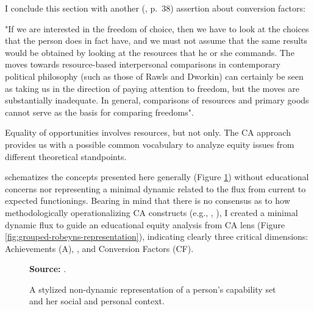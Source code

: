 I conclude this section with another  (\citeyear{sen:1992}, p.~38) assertion about conversion factors: 
\begin{citacao}
    "If we are interested in the freedom of choice, then we have to look at the choices that the person does in fact have, and we must not assume that the same results would be obtained by looking at the resources that he or she commands. The moves towards resource-based interpersonal comparisons in contemporary political philosophy (such as those of Rawls and Dworkin) can certainly be seen as taking us in the direction of paying attention to freedom, but the moves are substantially inadequate. In general, comparisons of resources and primary goods cannot serve as the basis for comparing freedoms".
\end{citacao}
Equality of opportunities involves resources, but not only. The \gls{CA} approach provides us with a possible common vocabulary to analyze equity issues from different theoretical standpoints. 

 schematizes the concepts presented here generally (Figure \ref{fig:robeyns-representation}) without educational concerns nor representing a minimal dynamic related to the flux from current to expected functionings. Bearing in mind that there is no consensus as to how methodologically operationalizing \gls{CA} constructs (e.g., , ), I created a minimal dynamic flux to guide an educational equity analysis from \gls{CA} lens (Figure \ref{fig:grouped-robeyns-representation}), indicating clearly three critical dimensions: Achievements (\acrshort{A}), , and Conversion Factors (\acrshort{CF}). 

\begin{figure}[ht!]
\centering

\caption{\textmd{A stylized non-dynamic representation of a person's capability set and her social and personal context.}}
\label{fig:robeyns-representation}

\par\medskip\ABNTEXfontereduzida\selectfont\textbf{Source:} .
\end{figure}

